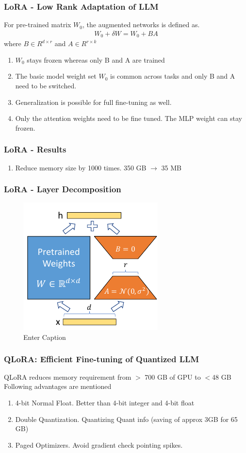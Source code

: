 \documentclass{beamer}
\theoremstyle{plain}
\theoremstyle{definition}
\theoremstyle{remark}
\numberwithin{equation}{section}
\numberwithin{figure}{section}
\numberwithin{theorem}{section}
\renewcommand{\to}{\longrightarrow}
\begin{document}
\begin{frame}[shrink]
\frametitle{LoRA - Low Rank Adaptation of LLM}
For pre-trained matrix $W_0$, the augmented networks is defined as.
\begin{align}
    W_0 + \delta W = W_0 + BA
\end{align}
where $B \in R^{d \times r}$ and $A\in R^{r\times k}$
\begin{enumerate}
\item $W_0$ stays frozen whereas only B and A are trained
\item The basic model weight set $W_0$ is common across tasks and only B and A need to be switched.
\item Generalization is possible for full fine-tuning as well.
\item Only the attention weights need to be fine tuned. The MLP weight can stay frozen.
\end{enumerate}
\end{frame}

\begin{frame}
\frametitle{LoRA - Results}
\begin{enumerate}
    \item Reduce memory size by 1000 times. 350 GB $\to$ 35 MB
\end{enumerate}
\end{frame}


\begin{frame}
\frametitle{LoRA - Layer Decomposition}
\begin{figure}
    \centering
    \includegraphics[width=0.5\linewidth]{lora.png}
    \caption{Enter Caption}
    \label{fig:enter-label}
\end{figure}
\end{frame}


                        

\begin{frame}
\frametitle{QLoRA: Efficient Fine-tuning of Quantized LLM}
QLoRA reduces memory requirement from $>$ 700 GB of GPU to $<$48 GB
Following advantages are mentioned
\begin{enumerate}
    \item 4-bit Normal Float. Better than 4-bit integer and 4-bit float
    \item Double Quantization. Quantizing Quant info (saving of approx 3GB for 65 GB)
    \item Paged Optimizers. Avoid gradient check pointing spikes.
\end{enumerate}
\end{frame}
\end{document}
